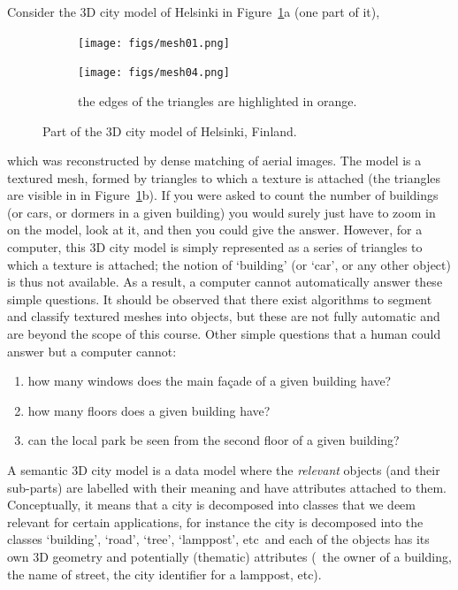 Consider the 3D city model of Helsinki in Figure~\ref{fig:mesh}a (one part of it),
\begin{figure}
  \centering
  \begin{subfigure}[b]{0.48\linewidth}
    \centering
    \texttt{[image: figs/mesh01.png]}
    \caption{}
  \end{subfigure}
  \begin{subfigure}[b]{0.48\linewidth}
    \centering
    \texttt{[image: figs/mesh04.png]}
    \caption{the edges of the triangles are highlighted in orange.}
  \end{subfigure}
\caption{Part of the 3D city model of Helsinki, Finland.}%
\label{fig:mesh}
\end{figure}
which was reconstructed by dense matching of aerial images.
The model is a textured mesh, formed by triangles to which a texture is attached (the triangles are visible in in Figure~\ref{fig:mesh}b).
If you were asked to count the number of buildings (or cars, or dormers in a given building) you would surely just have to zoom in on the model, look at it, and then you could give the answer.
However, for a computer, this 3D city model is simply represented as a series of triangles to which a texture is attached; the notion of `building' (or `car', or any other object) is thus not available.
As a result, a computer cannot automatically answer these simple questions.
It should be observed that there exist algorithms to segment and classify textured meshes into objects, but these are not fully automatic and are beyond the scope of this course.
Other simple questions that a human could answer but a computer cannot:
\begin{enumerate}
  \item how many windows does the main façade of a given building have?
  \item how many floors does a given building have?
  \item can the local park be seen from the second floor of a given building?
\end{enumerate}

%

A semantic 3D city model is a data model where the \emph{relevant} objects (and their sub-parts) are labelled with their meaning and have attributes attached to them.
Conceptually, it means that a city is decomposed into classes that we deem relevant for certain applications, for instance the city is decomposed into the classes `building', `road', `tree', `lamppost', etc\ and each of the objects has its own 3D geometry and potentially (thematic) attributes (\eg\ the owner of a building, the name of street, the city identifier for a lamppost, etc).

